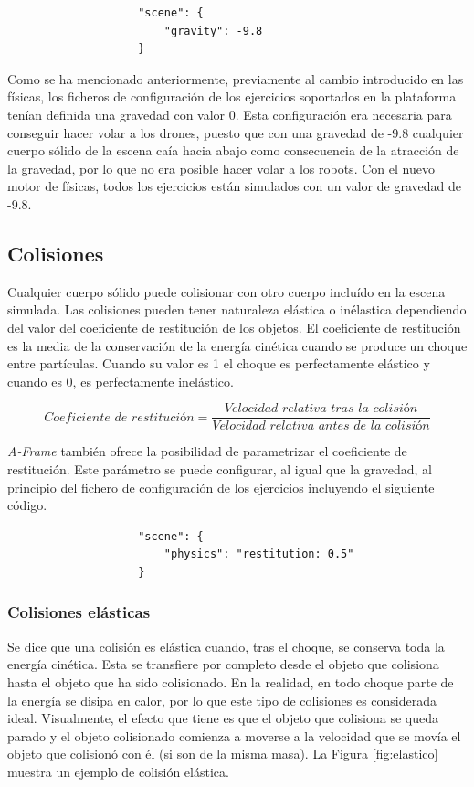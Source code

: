 \begin{verbatim}
                    "scene": {
                        "gravity": -9.8
                    }
\end{verbatim}

Como se ha mencionado anteriormente, previamente al cambio introducido en las físicas, los ficheros de configuración de los ejercicios soportados en la plataforma tenían definida una gravedad con valor 0. Esta configuración era necesaria para conseguir hacer volar a los drones, puesto que con una gravedad de -9.8 cualquier cuerpo sólido de la escena caía hacia abajo como consecuencia de la atracción de la gravedad, por lo que no era posible hacer volar a los robots. Con el nuevo motor de físicas, todos los ejercicios están simulados con un valor de gravedad de -9.8.  \newline

\subsection{Colisiones}
Cualquier cuerpo sólido puede colisionar con otro cuerpo incluído en la escena simulada. Las colisiones pueden tener naturaleza elástica o inélastica dependiendo del valor del coeficiente de restitución de los objetos. El coeficiente de restitución es la media de la conservación de la energía cinética cuando se produce un choque entre partículas. Cuando su valor es 1 el choque es perfectamente elástico y cuando es 0, es perfectamente inelástico. 

\begin{equation}
   Coeficiente \,\, de \,\,restitución = \frac{Velocidad \,\, relativa \,\, tras \,\, la \,\, colisión}{Velocidad \,\, relativa \,\, antes \,\, de \,\, la \,\, colisión}
\end{equation} \newline

\textit{A-Frame} también ofrece la posibilidad de parametrizar el coeficiente de restitución. Este parámetro se puede configurar, al igual que la gravedad, al principio del fichero de configuración de los ejercicios incluyendo el siguiente código.

\begin{verbatim}
                    "scene": {
                        "physics": "restitution: 0.5"
                    }
\end{verbatim}

\subsubsection{Colisiones elásticas}
Se dice que una colisión es elástica cuando, tras el choque, se conserva toda la energía cinética. Esta se transfiere por completo desde el objeto que colisiona hasta el objeto que ha sido colisionado. En la realidad, en todo choque parte de la energía se disipa en calor, por lo que este tipo de colisiones es considerada ideal. Visualmente, el efecto que tiene es que el objeto que colisiona se queda parado y el objeto colisionado comienza a moverse a la velocidad que se movía el objeto que colisionó con él (si son de la misma masa). La Figura \ref{fig:elastico} muestra un ejemplo de colisión elástica.


